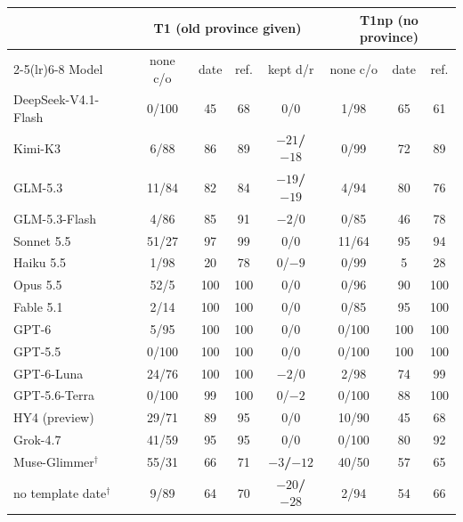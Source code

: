 \begin{tabular}{@{}l ccc c ccc@{}}
\toprule
 & \multicolumn{4}{c}{T1 (old province given)} & \multicolumn{3}{c}{T1np (no province)} \\
\cmidrule(lr){2-5}\cmidrule(lr){6-8}
Model & none c/o & date & ref. & kept d/r & none c/o & date & ref. \\
\midrule
DeepSeek-V4.1-Flash & 0/100 & 45 & 68 & $0$/$0$ & 1/98 & 65 & 61 \\
Kimi-K3 & 6/88 & 86 & 89 & \textbf{$-21$/$-18$} & 0/99 & 72 & 89 \\
GLM-5.3 & 11/84 & 82 & 84 & \textbf{$-19$/$-19$} & 4/94 & 80 & 76 \\
GLM-5.3-Flash & 4/86 & 85 & 91 & $-2$/$0$ & 0/85 & 46 & 78 \\
Sonnet 5.5 & 51/27 & 97 & 99 & $0$/$0$ & 11/64 & 95 & 94 \\
Haiku 5.5 & 1/98 & 20 & 78 & $0$/$-9$ & 0/99 & 5 & 28 \\
Opus 5.5 & 52/5 & 100 & 100 & $0$/$0$ & 0/96 & 90 & 100 \\
Fable 5.1 & 2/14 & 100 & 100 & $0$/$0$ & 0/85 & 95 & 100 \\
GPT-6 & 5/95 & 100 & 100 & $0$/$0$ & 0/100 & 100 & 100 \\
GPT-5.5 & 0/100 & 100 & 100 & $0$/$0$ & 0/100 & 100 & 100 \\
GPT-6-Luna & 24/76 & 100 & 100 & $-2$/$0$ & 2/98 & 74 & 99 \\
GPT-5.6-Terra & 0/100 & 99 & 100 & $0$/$-2$ & 0/100 & 88 & 100 \\
HY4 (preview) & 29/71 & 89 & 95 & $0$/$0$ & 10/90 & 45 & 68 \\
Grok-4.7 & 41/59 & 95 & 95 & $0$/$0$ & 0/100 & 80 & 92 \\
Muse-Glimmer$^\dagger$ & 55/31 & 66 & 71 & \textbf{$-3$/$-12$} & 40/50 & 57 & 65 \\
\quad no template date$^\dagger$ & 9/89 & 64 & 70 & \textbf{$-20$/$-28$} & 2/94 & 54 & 66 \\
\bottomrule
\end{tabular}
